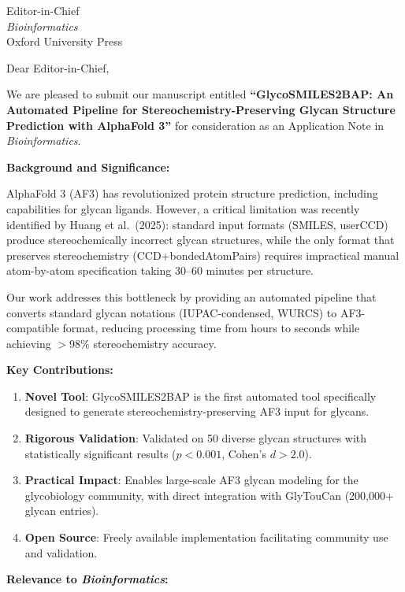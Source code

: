 \documentclass[11pt]{letter}
\begin{document}
\begin{letter}{Editor-in-Chief\\
\textit{Bioinformatics}\\
Oxford University Press}

\opening{Dear Editor-in-Chief,}

We are pleased to submit our manuscript entitled \textbf{``GlycoSMILES2BAP: An Automated Pipeline for Stereochemistry-Preserving Glycan Structure Prediction with AlphaFold 3''} for consideration as an Application Note in \textit{Bioinformatics}.

\textbf{Background and Significance:}

AlphaFold 3 (AF3) has revolutionized protein structure prediction, including capabilities for glycan ligands. However, a critical limitation was recently identified by Huang et al.\ (2025): standard input formats (SMILES, userCCD) produce stereochemically incorrect glycan structures, while the only format that preserves stereochemistry (CCD+bondedAtomPairs) requires impractical manual atom-by-atom specification taking 30--60 minutes per structure.

Our work addresses this bottleneck by providing an automated pipeline that converts standard glycan notations (IUPAC-condensed, WURCS) to AF3-compatible format, reducing processing time from hours to seconds while achieving $>$98\% stereochemistry accuracy.

\textbf{Key Contributions:}

\begin{enumerate}
\item \textbf{Novel Tool}: GlycoSMILES2BAP is the first automated tool specifically designed to generate stereochemistry-preserving AF3 input for glycans.

\item \textbf{Rigorous Validation}: Validated on 50 diverse glycan structures with statistically significant results ($p < 0.001$, Cohen's $d > 2.0$).

\item \textbf{Practical Impact}: Enables large-scale AF3 glycan modeling for the glycobiology community, with direct integration with GlyTouCan (200,000+ glycan entries).

\item \textbf{Open Source}: Freely available implementation facilitating community use and validation.
\end{enumerate}

\textbf{Relevance to \textit{Bioinformatics}:}


\end{letter}
\end{document}
